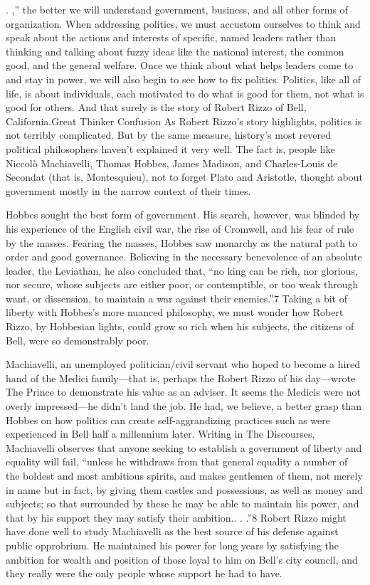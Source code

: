 \documentclass[10pt]{article}
\begin{document}
{\large . ,'' the better we will understand government, business, and all other
forms of organization. When addressing politics, we must accustom ourselves to
think and speak about the actions and interests of specific, named leaders rather
than thinking and talking about fuzzy ideas like the national interest, the
common good, and the general welfare. Once we think about what helps leaders come
to and stay in power, we will also begin to see how to fix politics. Politics,
like all of life, is about individuals, each motivated to do what is good for
them, not what is good for others. And that surely is the story of Robert Rizzo
of Bell, California.Great Thinker Confusion As Robert Rizzo's story highlights,
politics is not terribly complicated. But by the same measure, history's most
revered political philosophers haven't explained it very well. The fact is,
people like Niccol\`{o} Machiavelli, Thomas Hobbes, James Madison, and
Charles-Louis de Secondat (that is, Montesquieu), not to forget Plato and
Aristotle, thought about government mostly in the narrow context of their times.}

{\large Hobbes sought the best form of government. His search, however, was
blinded by his experience of the English civil war, the rise of Cromwell, and his
fear of rule by the masses. Fearing the masses, Hobbes saw monarchy as the
natural path to order and good governance. Believing in the necessary benevolence
of an absolute leader, the Leviathan, he also concluded that, ``no king can be
rich, nor glorious, nor secure, whose subjects are either poor, or contemptible,
or too weak through want, or dissension, to maintain a war against their
enemies.''7 Taking a bit of liberty with Hobbes's more nuanced philosophy, we
must wonder how Robert Rizzo, by Hobbesian lights, could grow so rich when his
subjects, the citizens of Bell, were so demonstrably poor.}

{\large Machiavelli, an unemployed politician/civil servant who hoped to become
a hired hand of the Medici family---that is, perhaps the Robert Rizzo of his
day---wrote The Prince to demonstrate his value as an adviser. It seems the
Medicis were not overly impressed---he didn't land the job. He had, we believe, a
better grasp than Hobbes on how politics can create self-aggrandizing practices
such as were experienced in Bell half a millennium later. Writing in The
Discourses, Machiavelli observes that anyone seeking to establish a government of
liberty and equality will fail, ``unless he withdraws from that general equality
a number of the boldest and most ambitious spirits, and makes gentlemen of them,
not merely in name but in fact, by giving them castles and possessions, as well
as money and subjects; so that surrounded by these he may be able to maintain his
power, and that by his support they may satisfy their ambition.. . .''8 Robert
Rizzo might have done well to study Machiavelli as the best source of his defense
against public opprobrium. He maintained his power for long years by satisfying
the ambition for wealth and position of those loyal to him on Bell's city
council, and they really were the only people whose support he had to have.}
\end{document}
